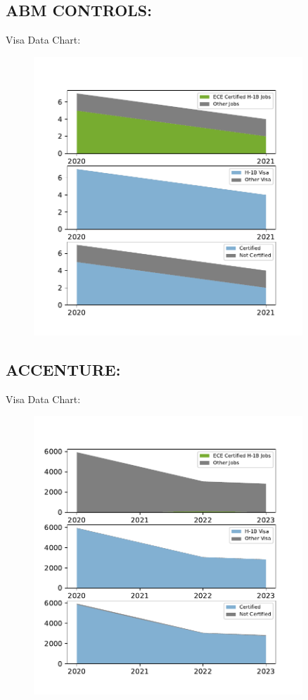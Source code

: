\documentclass{article}%
\begin{document}
%
\newpage%
\subsection{ABM CONTROLS:}%
\label{subsec:ABMCONTROLS}%
Visa Data Chart:%


\begin{figure}[htbp]%
\centering%
\includegraphics[width=0.9\textwidth]{./temp_img/ABMCONTROLS_detailed.pdf}%
\end{figure}

%
\newpage%
\subsection{ACCENTURE:}%
\label{subsec:ACCENTURE}%
Visa Data Chart:%


\begin{figure}[htbp]%
\centering%
\includegraphics[width=0.9\textwidth]{./temp_img/ACCENTURE_detailed.pdf}%
\end{figure}
\end{document}
